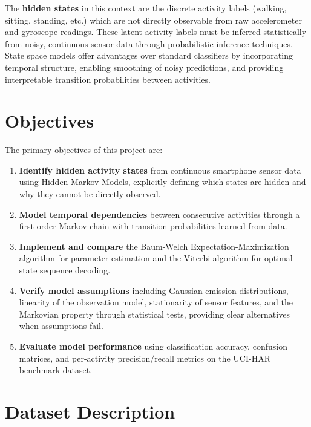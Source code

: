 \documentclass[11pt,a4paper]{article}
\begin{document}
The \textbf{hidden states} in this context are the discrete activity labels (walking, sitting, standing, etc.) which are not directly observable from raw accelerometer and gyroscope readings. These latent activity labels must be inferred statistically from noisy, continuous sensor data through probabilistic inference techniques. State space models offer advantages over standard classifiers by incorporating temporal structure, enabling smoothing of noisy predictions, and providing interpretable transition probabilities between activities.

\section{Objectives}

The primary objectives of this project are:

\begin{enumerate}[leftmargin=*]
    \item \textbf{Identify hidden activity states} from continuous smartphone sensor data using Hidden Markov Models, explicitly defining which states are hidden and why they cannot be directly observed.
    
    \item \textbf{Model temporal dependencies} between consecutive activities through a first-order Markov chain with transition probabilities learned from data.
    
    \item \textbf{Implement and compare} the Baum-Welch Expectation-Maximization algorithm for parameter estimation and the Viterbi algorithm for optimal state sequence decoding.
    
    \item \textbf{Verify model assumptions} including Gaussian emission distributions, linearity of the observation model, stationarity of sensor features, and the Markovian property through statistical tests, providing clear alternatives when assumptions fail.
    
    \item \textbf{Evaluate model performance} using classification accuracy, confusion matrices, and per-activity precision/recall metrics on the UCI-HAR benchmark dataset.
\end{enumerate}

\section{Dataset Description}
\end{document}
